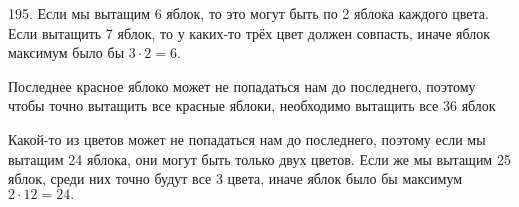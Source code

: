 195. Если мы вытащим 6 яблок, то это могут быть по 2 яблока каждого цвета. Если вытащить 7 яблок, то у каких-то трёх цвет должен совпасть, иначе яблок максимум было бы $3\cdot2=6.$

Последнее красное яблоко может не попадаться нам до последнего, поэтому чтобы точно вытащить все красные яблоки, необходимо вытащить все 36 яблок

Какой-то из цветов может не попадаться нам до последнего, поэтому если мы вытащим 24 яблока, они могут быть только двух цветов. Если же мы вытащим 25 яблок, среди них точно будут все 3 цвета, иначе яблок было бы максимум $2\cdot12=24.$\\
